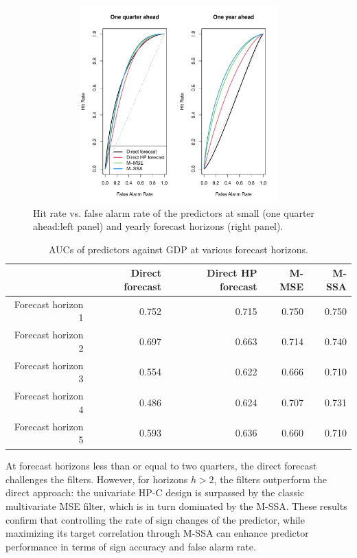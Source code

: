 \documentclass[a4paper]{article}
\begin{document}
\begin{figure}[H]\begin{center}\includegraphics[height=3in, width=5in]{./Figures/ROC_GDP_shift_1_4.pdf}\caption{Hit rate vs. false alarm rate of the predictors at small (one quarter ahead:left panel) and yearly forecast horizons (right panel).\label{ROC_GDP_shift_1_4}}\end{center}\end{figure}
\begin{table}[ht]
\centering
\begin{tabular}{rrrrr}
  \hline
 & Direct forecast & Direct HP forecast & M-MSE & M-SSA \\ 
  \hline
Forecast horizon 1 & 0.752 & 0.715 & 0.750 & 0.750 \\ 
  Forecast horizon 2 & 0.697 & 0.663 & 0.714 & 0.740 \\ 
  Forecast horizon 3 & 0.554 & 0.622 & 0.666 & 0.710 \\ 
  Forecast horizon 4 & 0.486 & 0.624 & 0.707 & 0.731 \\ 
  Forecast horizon 5 & 0.593 & 0.636 & 0.660 & 0.710 \\ 
   \hline
\end{tabular}
\caption{AUCs of predictors against GDP at various forecast horizons.} 
\label{p_val_wc5}
\end{table}At forecast horizons less than or equal to two quarters, the direct forecast challenges the filters. However, for horizons $h>2$, the filters outperform the direct approach: the univariate HP-C design is surpassed by the classic multivariate MSE filter, which is in turn dominated by the M-SSA. These results confirm that controlling the rate of sign changes of the predictor, while maximizing its target correlation through M-SSA can enhance predictor performance in terms of sign accuracy and false alarm rate.
\end{document}

